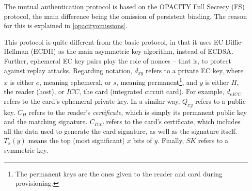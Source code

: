 \documentclass[12pt,a4paper,twoside,openright]{report}
\begin{document}
The mutual authentication protocol is based on the OPACITY \cite{OPACITY} Full Secrecy (FS) protocol, the main difference being the omission of persistent binding. The reason for this is explained in \autoref{opacityomissions}.

This protocol is quite different from the basic protocol, in that it uses EC Diffie-Hellman (ECDH) as the main asymmetric key algorithm, instead of ECDSA. Further, ephemeral EC key pairs play the role of nonces -- that is, to protect against replay attacks. Regarding notation, $d_{xy}$ refers to a private EC key, where $x$ is either $e$, meaning ephemeral, or $s$, meaning permanent\footnote{The permanent keys are the ones given to the reader and card during provisioning.}, and $y$ is either $H$, the reader (host), or $ICC$, the card (integrated circuit card). For example, $d_{eICC}$ refers to the card's ephemeral private key. In a similar way, $Q_{xy}$ refers to a public key. $C_{H}$ refers to the reader's \emph{certificate}, which is simply its permanent public key and the matching signature. $C_{ICC}$ refers to the card's certificate, which includes all the data used to generate the card signature, as well as the signature itself. $T_x(y)$ means the top (most significant) $x$ bits of $y$. Finally, $SK$ refers to a symmetric key.
\end{document}
